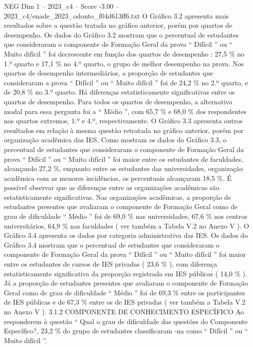 \begin{textsample}{NEG Dim 1 – 2023\_c4 – Score -3.00 – 2023\_c4/enade\_2023\_odonto\_f04d613ff6.txt}
O Gráfico 3.2 apresenta mais resultados sobre a questão tratada no gráfico anterior, porém por quartos de desempenho.
Os dados do Gráfico 3.2 mostram que o percentual de estudantes que consideraram o componente de Formação Geral da prova “ Difícil ” ou “ Muito difícil ” foi decrescente em função dos quartos de desempenho : 27,5 \% no 1.º quarto e 17,1 \% no 4.º quarto, o grupo de melhor desempenho na prova.
Nos quartos de desempenho intermediários, a proporção de estudantes que consideraram a prova “ Difícil ” ou “ Muito difícil ” foi de 24,2 \% no 2.º quarto, e de 20,8 \% no 3.º quarto.
Há diferenças estatisticamente significativas entre os quartos de desempenho.
Para todos os quartos de desempenho, a alternativa modal para essa pergunta foi a “ Médio ”, com 65,7 \% e 68,0 \% dos respondentes nos quartos extremos, 1.º e 4.º, respectivamente.
O Gráfico 3.3 apresenta outros resultados em relação à mesma questão retratada no gráfico anterior, porém por organização acadêmica das IES.
Como mostram os dados do Gráfico 3.3, o percentual de estudantes que consideraram o componente de Formação Geral da prova “ Difícil ” ou “ Muito difícil ” foi maior entre os estudantes de faculdades, alcançando 27,2 \%, enquanto entre os estudantes das universidades, organização acadêmica com as menores incidências, os percentuais alcançaram 18,5 \%.
É possível observar que as diferenças entre as organizações acadêmicas são estatisticamente significativas.
Nas organizações acadêmicas, a proporção de estudantes presentes que avaliaram o componente de Formação Geral como de grau de dificuldade “ Médio ” foi de 69,0 \% nas universidades, 67,6 \% nos centros universitários, 64,9 \% nas faculdades ( ver também a Tabela V.2 no Anexo V ).
O Gráfico 3.4 apresenta os dados por categoria administrativa das IES.
Os dados do Gráfico 3.4 mostram que o percentual de estudantes que consideraram o componente de Formação Geral da prova “ Difícil ” ou “ Muito difícil ” foi maior entre os estudantes de cursos de IES privadas ( 23,6 \% ), com diferença estatisticamente significativa da proporção registrada em IES públicas ( 14,0 \% ).
Já a proporção de estudantes presentes que avaliaram o componente de Formação Geral como de grau de dificuldade “ Médio ” foi de 69,3 \% entre os participantes de IES públicas e de 67,3 \% entre os de IES privadas ( ver também a Tabela V.2 no Anexo V ). 3.1.2 COMPONENTE DE CONHECIMENTO ESPECÍFICO Ao responderem à questão “ Qual o grau de dificuldade das questões do Componente Específico?, 23,2 \% do grupo de estudantes classificaram -na como “ Difícil ” ou “ Muito difícil ”.

\end{textsample}
